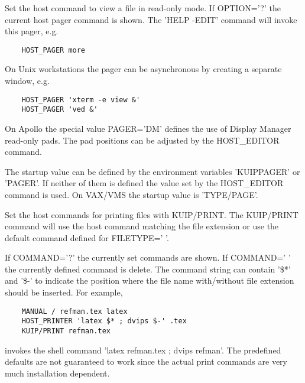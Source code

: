 \ENDCMD


\BEGARG
{}
\ENDARG

   \par
Set the host command to view a file in read-only mode.  If OPTION='?' the 
   current host pager command is shown.  The 'HELP -EDIT' command will invoke 
   this pager, e.g.  
\begin{verbatim}
    HOST_PAGER more
\end{verbatim}
\ENDVERB
   \par
On Unix workstations the pager can be asynchronous by creating a separate 
   window, e.g.  
\begin{verbatim}
    HOST_PAGER 'xterm -e view &'
    HOST_PAGER 'ved &'
\end{verbatim}
\ENDVERB
   \par
On Apollo the special value PAGER='DM' defines the use of Display Manager 
   read-only pads.  The pad positions can be adjusted by the HOST\_EDITOR 
   command.  

   \par
The startup value can be defined by the environment variables 'KUIPPAGER' 
   or 'PAGER'.  If neither of them is defined the value set by the 
   HOST\_EDITOR command is used.  On VAX/VMS the startup value is 'TYPE/PAGE'. 

\ENDCMD


\BEGARG
{}
\ENDARG

   \par
Set the host commands for printing files with KUIP/PRINT.  The KUIP/PRINT 
   command will use the host command matching the file extension or use the 
   default command defined for FILETYPE=' '.  

   \par
If COMMAND='?' the currently set commands are shown.  If COMMAND=' ' the 
   currently defined command is delete.  The command string can contain '\$*' 
   and '\$-' to indicate the position where the file name with/without file 
   extension should be inserted.  For example, 
\begin{verbatim}
    MANUAL / refman.tex latex
    HOST_PRINTER 'latex $* ; dvips $-' .tex
    KUIP/PRINT refman.tex
\end{verbatim}
   \par
invokes the shell command 'latex refman.tex ; dvips refman'.  The 
   predefined defaults are not guaranteed to work since the actual print 
   commands are very much installation dependent.  

